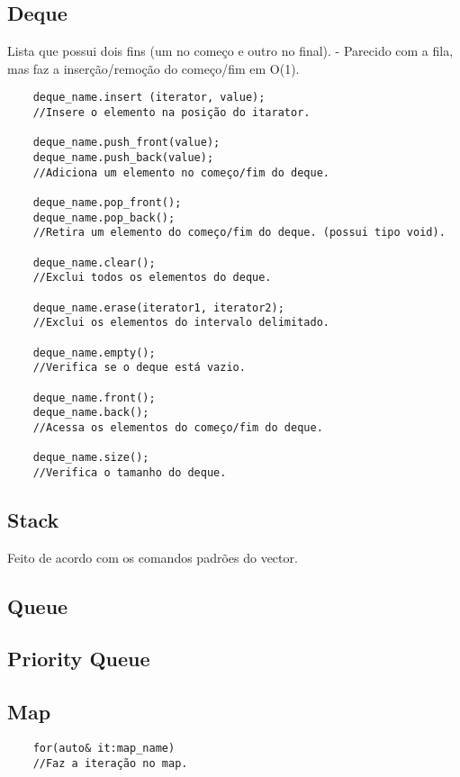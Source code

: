 \subsection{Deque}
    Lista que possui dois fins (um no começo e outro no final).
    - Parecido com a fila, mas faz a inserção/remoção do começo/fim em O(1).
\begin{verbatim}
    deque_name.insert (iterator, value);
    //Insere o elemento na posição do itarator.

    deque_name.push_front(value);
    deque_name.push_back(value);
    //Adiciona um elemento no começo/fim do deque.

    deque_name.pop_front();
    deque_name.pop_back();
    //Retira um elemento do começo/fim do deque. (possui tipo void).

    deque_name.clear();
    //Exclui todos os elementos do deque.

    deque_name.erase(iterator1, iterator2);
    //Exclui os elementos do intervalo delimitado.

    deque_name.empty();
    //Verifica se o deque está vazio.

    deque_name.front();
    deque_name.back();
    //Acessa os elementos do começo/fim do deque.

    deque_name.size();
    //Verifica o tamanho do deque.
\end{verbatim}

\subsection{Stack}
    Feito de acordo com os comandos padrões do vector.

\subsection{Queue}

\subsection{Priority Queue}

\subsection{Map}
\begin{verbatim}
    for(auto& it:map_name)
    //Faz a iteração no map.
\end{verbatim}

